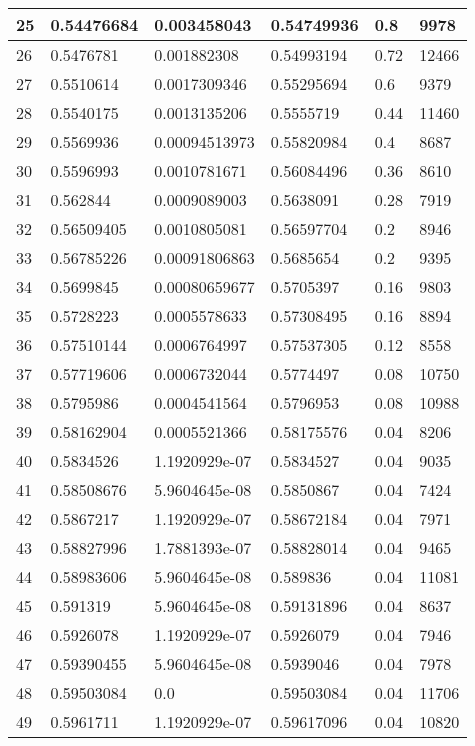 \begin{longtable}{|l|l|l|l|l|l|}
25 & 0.54476684 & 0.003458043 & 0.54749936 & 0.8 & 9978 \\ \hline 
26 & 0.5476781 & 0.001882308 & 0.54993194 & 0.72 & 12466 \\ \hline 
27 & 0.5510614 & 0.0017309346 & 0.55295694 & 0.6 & 9379 \\ \hline 
28 & 0.5540175 & 0.0013135206 & 0.5555719 & 0.44 & 11460 \\ \hline 
29 & 0.5569936 & 0.00094513973 & 0.55820984 & 0.4 & 8687 \\ \hline 
30 & 0.5596993 & 0.0010781671 & 0.56084496 & 0.36 & 8610 \\ \hline 
31 & 0.562844 & 0.0009089003 & 0.5638091 & 0.28 & 7919 \\ \hline 
32 & 0.56509405 & 0.0010805081 & 0.56597704 & 0.2 & 8946 \\ \hline 
33 & 0.56785226 & 0.00091806863 & 0.5685654 & 0.2 & 9395 \\ \hline 
34 & 0.5699845 & 0.00080659677 & 0.5705397 & 0.16 & 9803 \\ \hline 
35 & 0.5728223 & 0.0005578633 & 0.57308495 & 0.16 & 8894 \\ \hline 
36 & 0.57510144 & 0.0006764997 & 0.57537305 & 0.12 & 8558 \\ \hline 
37 & 0.57719606 & 0.0006732044 & 0.5774497 & 0.08 & 10750 \\ \hline 
38 & 0.5795986 & 0.0004541564 & 0.5796953 & 0.08 & 10988 \\ \hline 
39 & 0.58162904 & 0.0005521366 & 0.58175576 & 0.04 & 8206 \\ \hline 
40 & 0.5834526 & 1.1920929e-07 & 0.5834527 & 0.04 & 9035 \\ \hline 
41 & 0.58508676 & 5.9604645e-08 & 0.5850867 & 0.04 & 7424 \\ \hline 
42 & 0.5867217 & 1.1920929e-07 & 0.58672184 & 0.04 & 7971 \\ \hline 
43 & 0.58827996 & 1.7881393e-07 & 0.58828014 & 0.04 & 9465 \\ \hline 
44 & 0.58983606 & 5.9604645e-08 & 0.589836 & 0.04 & 11081 \\ \hline 
45 & 0.591319 & 5.9604645e-08 & 0.59131896 & 0.04 & 8637 \\ \hline 
46 & 0.5926078 & 1.1920929e-07 & 0.5926079 & 0.04 & 7946 \\ \hline 
47 & 0.59390455 & 5.9604645e-08 & 0.5939046 & 0.04 & 7978 \\ \hline 
48 & 0.59503084 & 0.0 & 0.59503084 & 0.04 & 11706 \\ \hline 
49 & 0.5961711 & 1.1920929e-07 & 0.59617096 & 0.04 & 10820 \\ \hline 

\end{longtable}
